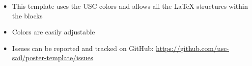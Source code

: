 \begin{itemize}
	\item This template uses the USC colors and allows all the LaTeX structures within the blocks
	\item Colors are easily adjustable
	\item Issues can be reported and tracked on GitHub: \url{https://github.com/usc-sail/poster-template/issues}
\end{itemize}
